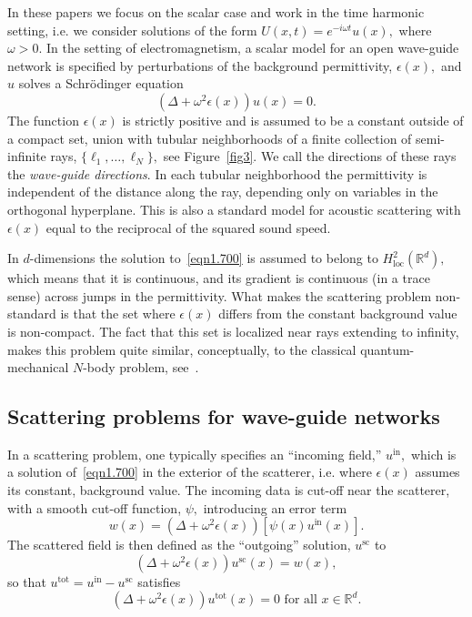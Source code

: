 \documentclass[11pt]{article}
\newcommand{\Bk}{\color{black}}
\newcommand{\Rd}{\color{black}}
\newcommand\loc{\operatorname{loc}}
\newcommand\tot{\operatorname{tot}}\newcommand\scat{\operatorname{sc}}
\newcommand\In{\operatorname{in}}
\newcommand\bbR{\mathbb R}
\theoremstyle{definition}
\theoremstyle{remark}
\begin{document}
 In these papers we focus on the scalar case and work in the time harmonic
 setting, i.e. we consider solutions of the form $U(x,t)=e^{-i\omega t}u(x),$
 where $\omega>0.$ \Rd In the setting of electromagnetism,  a scalar
 model for an open wave-guide network is specified by perturbations of the
 background permittivity,  \Bk $\epsilon(x),$ and $u$ solves a
 Schr\"odinger equation
\begin{equation}\label{eqn1.700}
  (\Delta+\omega^2\epsilon(x))u(x)=0.
\end{equation}
The function $\epsilon(x)$ is strictly positive and is assumed to be a constant
outside of a compact set, union with tubular neighborhoods of a finite
collection of semi-infinite rays, $\{\ell_1,\dots,\ell_N\},$ see
Figure~\ref{fig3}. \Rd We call the directions of these rays the {\em wave-guide
  directions}. \Bk In each tubular neighborhood the permittivity is independent
of the distance along the ray, depending only on variables in the orthogonal
hyperplane. \Rd This is also a standard model for acoustic scattering with
$\epsilon(x)$ equal to the reciprocal of the squared sound speed.\Bk


In $d$-dimensions the solution to~\eqref{eqn1.700} is assumed to belong to
$H^2_{\loc}(\bbR^d),$ which means that it is continuous, and its gradient is
continuous (in a trace sense) across jumps in the permittivity. What makes the
scattering problem non-standard is that the set where $\epsilon(x)$ differs from
the constant background value is non-compact. The fact that this set is
localized near rays extending to infinity, makes this problem quite similar,
conceptually, to the classical quantum-mechanical $N$-body problem,
see~\cite{PPS1981,Isozaki94,Melrose94,Vasy2000}.

\Rd
\subsection{Scattering problems for wave-guide networks}
In a scattering problem, one typically specifies an ``incoming field,''
$u^{\In},$ which is a solution of~\eqref{eqn1.700} in the exterior of the
scatterer, i.e. where $\epsilon(x)$ assumes its constant, background value. The
incoming data is cut-off near the scatterer, with a smooth cut-off function, $\psi,$ 
introducing an error term
\begin{equation}\label{eqn2.702}
  w(x)=(\Delta+\omega^2\epsilon(x))[\psi(x)u^{\In}(x)].
\end{equation}
The scattered field is then defined as the ``outgoing'' solution, $u^{\scat}$ to
\begin{equation}
  (\Delta+\omega^2\epsilon(x))u^{\scat}(x)=w(x),
\end{equation}
so that $u^{\tot}=u^{\In}-u^{\scat}$ satisfies
\begin{equation}\label{eqn4.702}
   (\Delta+\omega^2\epsilon(x))u^{\tot}(x)=0\text{ for all }x\in\bbR^d.
\end{equation}
\end{document}
